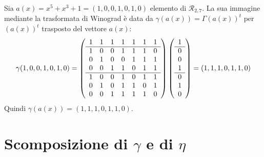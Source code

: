 \begin{esempio}
   Sia $a(x) = x^5 + x^3 + 1 = (1,0,0,1,0,1,0)$ elemento di $\mathcal{R}_{2,7} $. La sua immagine mediante la trasformata di Winograd è data da $\gamma(a(x)) = \Gamma (a(x))^{t}$ per $(a(x))^{t}$ trasposto del vettore $a(x)$:  
   \begin{align*}
    \gamma(1,0,0,1,0,1,0) = 
    \left(
    \begin{array} { c c c c c c c c}
    1 & 1 & 1 & 1 & 1 & 1 & 1  \\
    \hline
    1 & 0 & 0 & 1 & 1 & 1 & 0  \\
    0 & 1 & 0 & 0 & 1 & 1 & 1  \\
    0 & 0 & 1 & 1 & 0 & 1 & 1  \\
    \hline
    1 & 0 & 0 & 1 & 0 & 1 & 1  \\
    0 & 1 & 0 & 1 & 1 & 0 & 1  \\
    0 & 0 & 1 & 1 & 1 & 1 & 0  
    \end{array}
    \right)
    \left(
    \begin{array} { c }
    1  \\
    \hline
    0   \\
    0  \\
    1   \\
    \hline
    0   \\
    1   \\
    0  
    \end{array}
    \right)
    =
    (1,1,1,0,1,1,0)
    \end{align*}
   Quindi $\gamma(a(x)) = (1,1,1,0,1,1,0)$. 
\end{esempio}

\section{Scomposizione di $\gamma$ e di $\eta$}

